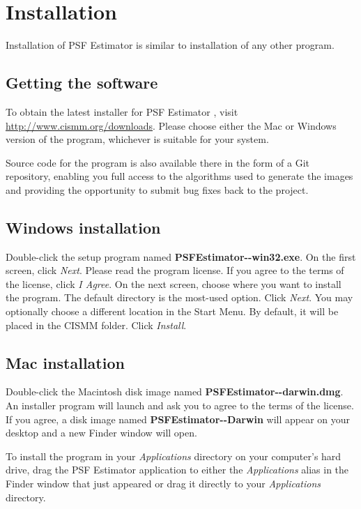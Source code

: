 \documentclass[11pt,titlepage,twoside]{article}
\begin{document}
\section{Installation}

Installation of PSF Estimator \ProgramVersion is similar to installation of any other program.

\subsection{Getting the software}

To obtain the latest installer for PSF Estimator \ProgramVersionNoSpace, visit \url{http://www.cismm.org/downloads}. Please choose either the Mac or Windows version of the program, whichever is suitable for your system.

Source code for the program is also available there in the form of a Git repository, enabling you full access to the algorithms used to generate the images and providing the opportunity to submit bug fixes back to the project. 

\subsection{Windows installation}

Double-click the setup program named \textbf{PSFEstimator-\ProgramVersionNoSpace-win32.exe}. On the first screen, click \emph{Next}. Please read the program license. If you agree to the terms of the license, click \emph{I Agree}. On the next screen, choose where you want to install the program. The default directory is the most-used option. Click \emph{Next}. You may optionally choose a different location in the Start Menu. By default, it will be placed in the CISMM folder. Click \emph{Install}.

\subsection{Mac installation}

Double-click the Macintosh disk image named \textbf{PSFEstimator-\ProgramVersionNoSpace-darwin.dmg}. An installer program will launch and ask you to agree to the terms of the license. If you agree, a disk image named \textbf{PSFEstimator-\ProgramVersionNoSpace-Darwin} will appear on your desktop and a new Finder window will open.

To install the program in your \emph{Applications} directory on your computer's hard drive, drag the PSF Estimator \ProgramVersion application to either the \emph{Applications} alias in the Finder window that just appeared or drag it directly to your \emph{Applications} directory.
\end{document}
